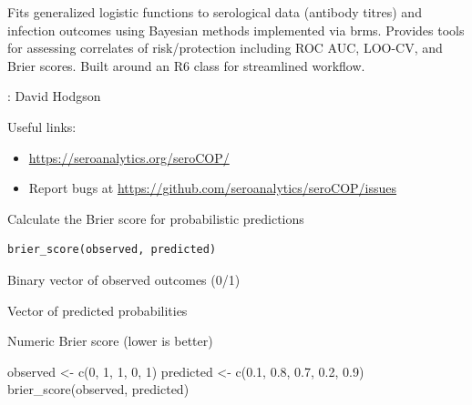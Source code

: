 \documentclass[a4paper]{book}
\begin{document}
%
\begin{Description}
Fits generalized logistic functions to serological data (antibody titres) and infection outcomes using Bayesian methods implemented via brms. Provides tools for assessing correlates of risk/protection including ROC AUC, LOO-CV, and Brier scores. Built around an R6 class for streamlined workflow.
\end{Description}
%
\begin{Author}
: David Hodgson 

\end{Author}
%
\begin{SeeAlso}
Useful links:
\begin{itemize}

\item{} \url{https://seroanalytics.org/seroCOP/}
\item{} Report bugs at \url{https://github.com/seroanalytics/seroCOP/issues}

\end{itemize}


\end{SeeAlso}
%
\begin{Description}
Calculate the Brier score for probabilistic predictions
\end{Description}
%
\begin{Usage}
\begin{verbatim}
brier_score(observed, predicted)
\end{verbatim}
\end{Usage}
%
\begin{Arguments}
\begin{ldescription}
\item[\code{observed}] Binary vector of observed outcomes (0/1)

\item[\code{predicted}] Vector of predicted probabilities
\end{ldescription}
\end{Arguments}
%
\begin{Value}
Numeric Brier score (lower is better)
\end{Value}
%
\begin{Examples}
\begin{ExampleCode}
observed <- c(0, 1, 1, 0, 1)
predicted <- c(0.1, 0.8, 0.7, 0.2, 0.9)
brier_score(observed, predicted)
\end{ExampleCode}
\end{Examples}
\end{document}
